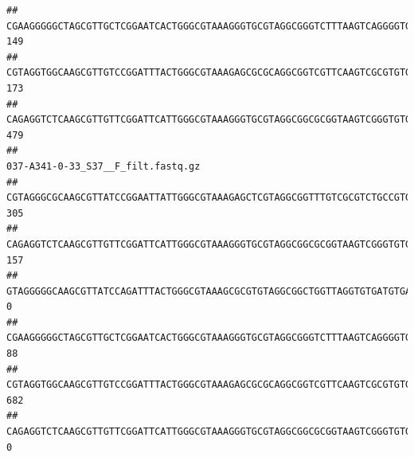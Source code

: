 \documentclass[]{article}
\begin{document}
\begin{verbatim}
## CGAAGGGGGCTAGCGTTGCTCGGAATCACTGGGCGTAAAGGGTGCGTAGGCGGGTCTTTAAGTCAGGGGTGAAATCCTGGAGCTCAACTCCAGAACTGCCTTTGATACTGAAGATCTTGAGTTCGGGAGAGGTGAGTGGAACTGCGAGTGTAGAGGTGAAATTCGTAGATATTCGCAAGAACACCAGTGGCGAAGGCGGCTCACTGGCCCGATACTGACGCTGAGGCACGAAAGCGTGGGGAGCAAACA                                 149
## CGTAGGTGGCAAGCGTTGTCCGGATTTACTGGGCGTAAAGAGCGCGCAGGCGGTCGTTCAAGTCGCGTGTGAAAGCCCCCGGCTCAACTGGGGAGGGTCACGCGATACTGATCGACTCGAAGGCAGGAGAGGGTAGTGGAATTCCCGGTGTAGTGGTGAAATGCGTAGATATCGGGAGGAACACCAGTGGCGAAGGCGACTACCTGGCCTGTTCTTGACGCTGAGGCGCGAAAGCTAGGGGAGCAAACG                                 173
## CAGAGGTCTCAAGCGTTGTTCGGATTCATTGGGCGTAAAGGGTGCGTAGGCGGCGCGGTAAGTCGGGTGTGAAATCTCGGGGCTTAACTCCGAAACTGCATTCGATACTGCCGTGCTTGAGGACTGGAGAGGAGACTGGAATTTACGGTGTAGCGGTGAAATGCGTAGATATCGTAAGGAAGACCAGTGGCGAAGGCGGGTCTCTGGACAGTTCCTGACGCTGAGGCACGAAGGCCAGGGGAGCAAACG                                 479
##                                                                                                                                                                                                                                                           037-A341-0-33_S37__F_filt.fastq.gz
## CGTAGGGCGCAAGCGTTATCCGGAATTATTGGGCGTAAAGAGCTCGTAGGCGGTTTGTCGCGTCTGCCGTGAAAGTCCGGGGCTCAACTCCGGATCTGCGGTGGGTACGGGCAGACTAGAGTGATGTAGGGGAGACTGGAATTCCTGGTGTAGCGGTGAAATGCGCAGATATCAGGAGGAACACCGATGGCGAAGGCAGGTCTCTGGGCATTAACTGACGCTGAGGAGCGAAAGCATGGGGAGCGAACA                                305
## CAGAGGTCTCAAGCGTTGTTCGGATTCATTGGGCGTAAAGGGTGCGTAGGCGGCGCGGTAAGTCGGGTGTGAAATCTCGGAGCTTAACTCCGAAACTGCATTCGATACTGCCGTGCTTGAGGACTGGAGAGGAGACTGGAATTTACGGTGTAGCGGTGAAATGCGTAGATATCGTAAGGAAGACCAGTGGCGAAGGCGGGTCTCTGGACAGTTCCTGACGCTGAGGCACGAAGGCCAGGGGAGCAAACG                                157
## GTAGGGGGCAAGCGTTATCCAGATTTACTGGGCGTAAAGCGCGTGTAGGCGGCTGGTTAGGTGTGATGTGAAATCTTCCGGCTCAACCGGAAAACTGCATTGCAAACCGGCCTGGCTAGAGTGCAGGAGAGGGAAGCGGAATTCCAGGTGTAGCGGTGAAATGCGTAGATATCTGGAGGAACACCAGTGGCGAAGGCGGCTTCCTGGCCTGCAACTGACGCTGAGACGCGAAAGCGTGGGGAGCGAAC                                   0
## CGAAGGGGGCTAGCGTTGCTCGGAATCACTGGGCGTAAAGGGTGCGTAGGCGGGTCTTTAAGTCAGGGGTGAAATCCTGGAGCTCAACTCCAGAACTGCCTTTGATACTGAAGATCTTGAGTTCGGGAGAGGTGAGTGGAACTGCGAGTGTAGAGGTGAAATTCGTAGATATTCGCAAGAACACCAGTGGCGAAGGCGGCTCACTGGCCCGATACTGACGCTGAGGCACGAAAGCGTGGGGAGCAAACA                                 88
## CGTAGGTGGCAAGCGTTGTCCGGATTTACTGGGCGTAAAGAGCGCGCAGGCGGTCGTTCAAGTCGCGTGTGAAAGCCCCCGGCTCAACTGGGGAGGGTCACGCGATACTGATCGACTCGAAGGCAGGAGAGGGTAGTGGAATTCCCGGTGTAGTGGTGAAATGCGTAGATATCGGGAGGAACACCAGTGGCGAAGGCGACTACCTGGCCTGTTCTTGACGCTGAGGCGCGAAAGCTAGGGGAGCAAACG                                682
## CAGAGGTCTCAAGCGTTGTTCGGATTCATTGGGCGTAAAGGGTGCGTAGGCGGCGCGGTAAGTCGGGTGTGAAATCTCGGGGCTTAACTCCGAAACTGCATTCGATACTGCCGTGCTTGAGGACTGGAGAGGAGACTGGAATTTACGGTGTAGCGGTGAAATGCGTAGATATCGTAAGGAAGACCAGTGGCGAAGGCGGGTCTCTGGACAGTTCCTGACGCTGAGGCACGAAGGCCAGGGGAGCAAACG                                  0

\end{verbatim}
\end{document}
